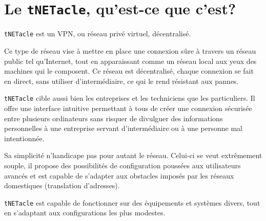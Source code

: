 ﻿\section{Le \texttt{tNETacle}, qu'est-ce que c'est?}
\texttt{tNETacle} est un VPN, ou réseau privé virtuel, décentralisé.

Ce type de réseau vise à mettre en place une connexion sûre à travers un réseau public tel qu'Internet, tout en apparaissant comme un réseau local aux yeux des machines qui le composent.
Ce réseau est décentralisé, chaque connexion se fait en direct, sans utiliser d'intermédiaire, ce qui le rend résistant aux pannes.

\texttt{tNETacle} cible aussi bien les entreprises et les techniciens que les particuliers.
Il offre une interface intuitive permettant à tous de créer une connexion sécurisée entre plusieurs ordinateurs sans risquer de divulguer des informations personnelles à une entreprise servant d'intermédiaire ou à une personne mal intentionnée.

Sa simplicité n'handicape pas pour autant le réseau. Celui-ci se veut extrêmement souple, il propose des possibilités de configuration poussées aux utilisateurs avancés et est capable de s'adapter aux obstacles imposés par les réseaux domestiques (translation d'adresses).

\texttt{tNETacle} est capable de fonctionner sur des équipements et systèmes divers, tout en s'adaptant aux configurations les plus modestes.
